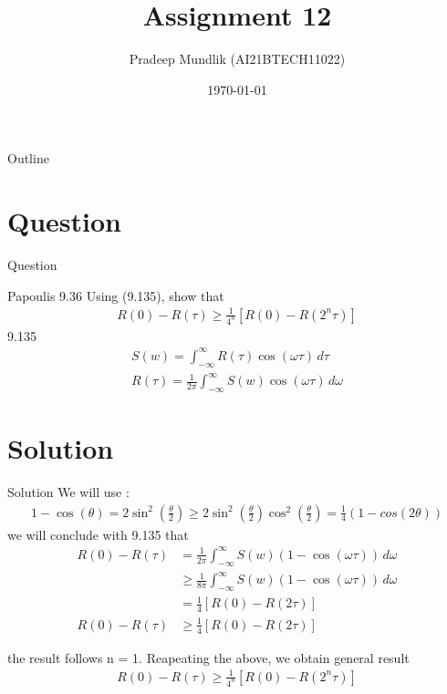 \documentclass{beamer}
\title{Assignment 12}
\author{Pradeep Mundlik (AI21BTECH11022)}
\date{\today}
\begin{document}
\begin{frame}
    \titlepage 
\end{frame}



\begin{frame}{Outline}
    \tableofcontents
\end{frame}


\section{Question}
\begin{frame}{Question}
    \begin{block}{Papoulis 9.36}
        Using (9.135), show that
        \begin{align}
            R(0) - R(\tau) \geq \frac{1}{4^n} [R(0) - R(2^n \tau)]
        \end{align}
        9.135
        \begin{align}
            S(w) = \int_{-\infty}^{\infty} R(\tau)\cos(\omega \tau) \,d\tau \\
            R(\tau) = \frac{1}{2\pi}\int_{-\infty}^{\infty} S(w)\cos(\omega \tau) \,d\omega
        \end{align}
    \end{block} 
\end{frame}

\section{Solution}
\begin{frame}{Solution}
        We will use : 
        \begin{align}
            1 - \cos(\theta) = 2\sin^2(\frac{\theta}{2}) \geq 2\sin^2(\frac{\theta}{2})\cos^2(\frac{\theta}{2}) = \frac{1}{4} (1 - cos(2\theta))
        \end{align}
        we will conclude with 9.135 that
        \begin{align}
            R(0) - R(\tau) &= \frac{1}{2\pi}\int_{-\infty}^{\infty} S(w)(1 - \cos(\omega \tau)) \,d\omega  \\
            &\geq \frac{1}{8\pi}\int_{-\infty}^{\infty} S(w)(1 - \cos(\omega \tau)) \,d\omega \\
            &= \frac{1}{4} [R(0) - R(2\tau)] \\
            R(0) - R(\tau) &\geq \frac{1}{4} [R(0) - R(2\tau)]
        \end{align}
\end{frame}
\begin{frame}
    the result follows n = 1. 
    Reapeating the above, we obtain general result
    \begin{align}
        R(0) - R(\tau) \geq \frac{1}{4^n} [R(0) - R(2^n \tau)]
    \end{align}
\end{frame}
\end{document}
